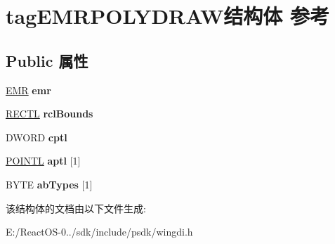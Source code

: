\hypertarget{structtag_e_m_r_p_o_l_y_d_r_a_w}{}\section{tag\+E\+M\+R\+P\+O\+L\+Y\+D\+R\+A\+W结构体 参考}
\label{structtag_e_m_r_p_o_l_y_d_r_a_w}
\subsection*{Public 属性}
\begin{DoxyCompactItemize}
\item 
\mbox{\label{structtag_e_m_r_p_o_l_y_d_r_a_w_af478b5fb1fa28036f3bff3941253e720}} 
\hyperlink{structtag_e_m_r}{E\+MR} {\bfseries emr}
\item 
\mbox{\label{structtag_e_m_r_p_o_l_y_d_r_a_w_a7109b390f7d71764f5217dc6548b299d}} 
\hyperlink{struct___r_e_c_t_l}{R\+E\+C\+TL} {\bfseries rcl\+Bounds}
\item 
\mbox{\label{structtag_e_m_r_p_o_l_y_d_r_a_w_a8363d4de5208cc9ecd6a20c4aec84538}} 
D\+W\+O\+RD {\bfseries cptl}
\item 
\mbox{\label{structtag_e_m_r_p_o_l_y_d_r_a_w_a0060bbeb88215918d6b9d8034b63f09c}} 
\hyperlink{struct___p_o_i_n_t_l}{P\+O\+I\+N\+TL} {\bfseries aptl} \mbox{[}1\mbox{]}
\item 
\mbox{\label{structtag_e_m_r_p_o_l_y_d_r_a_w_af14b0fbd66c142550eeed4a37ab37791}} 
B\+Y\+TE {\bfseries ab\+Types} \mbox{[}1\mbox{]}
\end{DoxyCompactItemize}


该结构体的文档由以下文件生成\+:\begin{DoxyCompactItemize}
\item 
E\+:/\+React\+O\+S-\/0../sdk/include/psdk/wingdi.\+h\end{DoxyCompactItemize}
